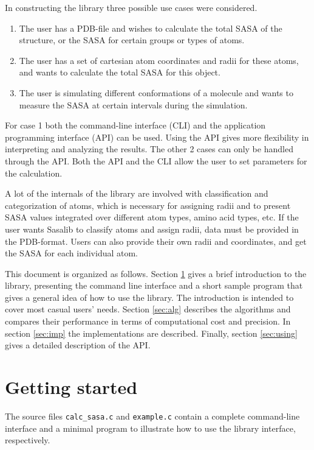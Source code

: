 \documentclass[a4paper,11pt]{article}
\begin{document}
In constructing the library three possible use cases were considered. 
\begin{enumerate}
\item The user has a PDB-file and wishes to calculate the total SASA of
  the structure, or the SASA for certain groups or types of atoms.
\item The user has a set of cartesian atom coordinates and radii for
  these atoms, and wants to calculate the total SASA for this object.
\item The user is simulating different conformations of a molecule and
  wants to measure the SASA at certain intervals during the simulation.
\end{enumerate}
For case 1 both the command-line interface (CLI) and the application
programming interface (API) can be used. Using the API gives more
flexibility in interpreting and analyzing the results. The other 2
cases can only be handled through the API. Both the API and the CLI
allow the user to set parameters for the calculation. 

A lot of the internals of the library are involved with classification
and categorization of atoms, which is necessary for assigning radii
and to present SASA values integrated over different atom types, amino
acid types, etc. If the user wants Sasalib to classify atoms and
assign radii, data must be provided in the PDB-format. Users can also
provide their own radii and coordinates, and get the SASA for each
individual atom.

This document is organized as follows. Section \ref{sec:howto_short}
gives a brief introduction to the library, presenting the command line
interface and a short sample program that gives a general idea of how
to use the library. The introduction is intended to cover most casual
users' needs. Section \ref{sec:alg} describes the algorithms and
compares their performance in terms of computational cost and
precision. In section \ref{sec:imp} the implementations are
described. Finally, section \ref{sec:using} gives a detailed
description of the API.

\section{Getting started}\label{sec:howto_short}

The source files \texttt{calc\_sasa.c} and \texttt{example.c} contain
a complete command-line interface and a minimal program to illustrate
how to use the library interface, respectively. 
\end{document}
